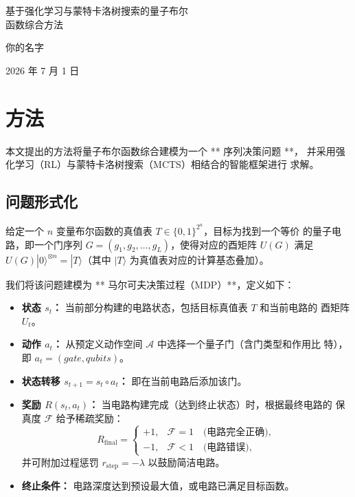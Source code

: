 \documentclass[11pt,letterpaper]{ctexart}
\begin{document}
\thispagestyle{plain}
\begin{center}
\vspace*{1.35in}
{\LARGE 基于强化学习与蒙特卡洛树搜索的量子布尔\\[0.35em]函数综合方法\par}
\vspace{0.42in}
{\large 你的名字\par}
\vspace{0.22in}
{\large 2026 年 7 月 1 日\par}
\end{center}
\vspace{0.42in}

\section{方法}

本文提出的方法将量子布尔函数综合建模为一个 ** 序列决策问题 **，
并采用强化学习（RL）与蒙特卡洛树搜索（MCTS）相结合的智能框架进行
求解。

\subsection{问题形式化}

给定一个 $n$ 变量布尔函数的真值表 $T \in \{0,1\}^{2^n}$，目标为找到一个等价
的量子电路，即一个门序列 $G=(g_1,g_2,\ldots,g_L)$，使得对应的酉矩阵 $U(G)$
满足 $U(G)|0\rangle^{\otimes n}=|T\rangle$（其中 $|T\rangle$ 为真值表对应的计算基态叠加）。

我们将该问题建模为 ** 马尔可夫决策过程（MDP）**，定义如下：

\begin{itemize}
  \item \textbf{状态 $s_t$：} 当前部分构建的电路状态，包括目标真值表 $T$ 和当前电路的
  酉矩阵 $U_t$。

  \item \textbf{动作 $a_t$：} 从预定义动作空间 $\mathcal{A}$ 中选择一个量子门（含门类型和作用比
  特），即 $a_t=(gate,qubits)$。

  \item \textbf{状态转移 $s_{t+1}=s_t\circ a_t$：} 即在当前电路后添加该门。

  \item \textbf{奖励 $R(s_t,a_t)$：} 当电路构建完成（达到终止状态）时，根据最终电路的
  保真度 $\mathcal{F}$ 给予稀疏奖励：
  \[
    R_{\mathrm{final}}=
    \begin{cases}
      +1, & \mathcal{F}=1 \quad \text{(电路完全正确)},\\
      -1, & \mathcal{F}<1 \quad \text{(电路错误)},
    \end{cases}
  \]
  并可附加过程惩罚 $r_{\mathrm{step}}=-\lambda$ 以鼓励简洁电路。

  \item \textbf{终止条件：} 电路深度达到预设最大值，或电路已满足目标函数。
\end{itemize}
\end{document}
